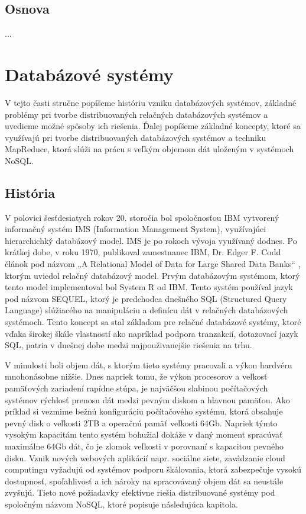 \documentclass[11pt,twoside,a4paper]{book}
\begin{document}
\section{Osnova}
...

\chapter{Databázové systémy}

V tejto časti stručne popíšeme históriu vzniku databázových systémov, základné problémy pri tvorbe distribuovaných relačných databázových systémov a uvedieme možné spôsoby ich riešenia. Ďalej popíšeme základné koncepty, ktoré sa využívajú pri tvorbe distribuovaných databázových systémov a techniku MapReduce, ktorá slúži na prácu s veľkým objemom dát uloženým v systémoch NoSQL.

\section{História}

V polovici šesťdesiatych rokov 20. storočia bol spoločnosťou IBM vytvorený informačný systém IMS (Information Management System), využívajúci hierarchichký databázový model. IMS je po rokoch vývoja využívaný dodnes. Po krátkej dobe, v roku 1970, publikoval zamestnanec IBM, Dr. Edger F. Codd článok pod názvom „A Relational Model of Data for Large Shared Data Banks“ \cite{CoddRelational}, ktorým uviedol relačný databázový model. Prvým databázovým systémom, ktorý tento model implementoval bol System R od IBM. Tento systém používal jazyk pod názvom SEQUEL, ktorý je predchodca dnešného SQL (Structured Query Language) slúžiacého na manipuláciu a definícu dát v relačných databázových systémoch. Tento koncept sa stal základom pre relačné databázové systémy, ktoré vďaka širokej škále vlastností ako napríklad podpora tranzakcií, dotazovací jazyk SQL, patria v dnešnej  dobe medzi najpouživanejšie riešenia na trhu.

V minulosti boli objem dát, s ktorým tieto systémy pracovali a výkon hardvéru mnohonásobne nižšie. Dnes napriek tomu, že výkon procesorov a veľkosť pamäťových zariadení rapídne stúpa, je najväčšou slabinou počítačových systémov rýchlosť prenosu dát medzi pevným diskom a hlavnou pamäťou. Ako príklad si vezmime bežnú konfiguráciu počítačového systému, ktorá obsahuje pevný disk o veľkosti 2TB a operačnú pamäť veľkosti 64Gb. Napriek týmto vysokým kapacitám tento systém bohužial dokáže v daný moment spracúvať maximálne 64Gb dát, čo je zlomok veľkosti v porovnaní s kapacitou pevného disku. Vznik nových webových aplikácií napr. sociálne siete, zavádzanie cloud computingu vyžadujú od systémov podporu škálovania, ktorá zabezpečuje vysokú dostupnosť, spoľahlivosť a ich nároky na spracovávaný objem dát sa neustále zvyšujú. Tieto nové požiadavky efektívne riešia distribuované systémy pod spoločným názvom NoSQL, ktoré popisuje následujúca kapitola.
\end{document}
